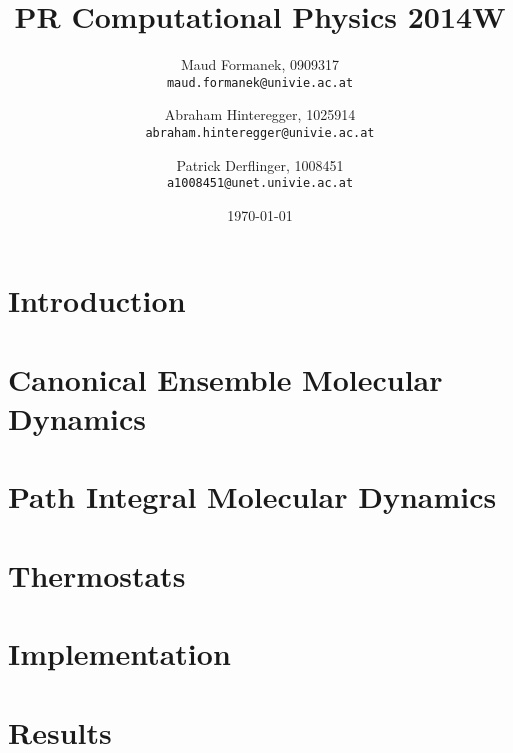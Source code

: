 \documentclass[a4paper]{article}
\title{PR Computational Physics 2014W}
\author{
	Maud Formanek, 0909317\\
    \texttt{maud.formanek@univie.ac.at}
	\and
    Abraham Hinteregger,  1025914\\
    \texttt{abraham.hinteregger@univie.ac.at}\and
    Patrick Derflinger,  1008451\\
    \texttt{a1008451@unet.univie.ac.at}
    }
\date{\today}
\begin{document}
\maketitle
\tableofcontents

\newpage

\section{Introduction} \label{intro}

\section{Canonical Ensemble Molecular Dynamics} \label{cemd}

\section{Path Integral Molecular Dynamics} \label{pimd}

\section{Thermostats} \label{thermostats}

\section{Implementation}\label{implementation}

\section{Results} \label{results}




%
%


\end{document}
